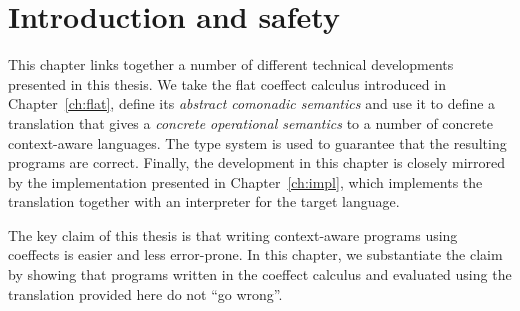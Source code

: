 \section{Introduction and safety}
\label{sec:semantics-intro}

This chapter links together a number of different technical developments presented in this thesis.
We take the flat coeffect calculus introduced in Chapter~\ref{ch:flat}, define its \emph{abstract
comonadic semantics} and use it to define a translation that gives a \emph{concrete operational
semantics} to a number of concrete context-aware languages. The type system is used to guarantee
that the resulting programs are correct. Finally, the development in this chapter is closely
mirrored by the implementation presented in Chapter~\ref{ch:impl}, which implements the
translation together with an interpreter for the target language.

The key claim of this thesis is that writing context-aware programs using coeffects is easier and
less error-prone. In this chapter, we substantiate the claim by showing that programs written in the
coeffect calculus and evaluated using the translation provided here do not ``go wrong''.


